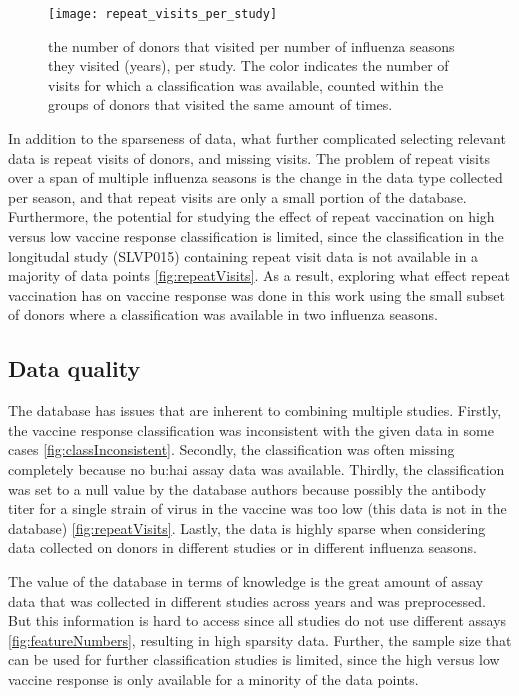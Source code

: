 \begin{figure}[htpb]
    \texttt{[image: repeat\_visits\_per\_study]}
    \caption{the number of donors that visited per number of influenza seasons
    they visited (years), per study. The color indicates the number of visits for which a
    classification was available, counted within the groups of donors that
    visited the same amount of times.}\label{fig:repeatVisits}
\end{figure}

In addition to the sparseness of data, what further complicated selecting relevant data is repeat visits of donors, and missing visits.
The problem of repeat visits over a span of multiple influenza seasons is the change in the data type collected per season, and that repeat visits are only a small portion of the database.
Furthermore, the potential for studying the effect of repeat vaccination on high versus low vaccine response classification is limited, since the classification in the longitudal study (SLVP015) containing repeat visit data is not available in a majority of data points \autoref{fig:repeatVisits}.
As a result, exploring what effect repeat vaccination has on vaccine response was done in this work using the small subset of donors where a classification was available in two influenza seasons.

\subsection{Data quality}

The database has issues that are inherent to combining multiple studies.
Firstly, the vaccine response classification was inconsistent with the given data in some cases \autoref{fig:classInconsistent}.
Secondly, the classification was often missing completely because no \gls{bu:hai} assay data was available.
Thirdly, the classification was set to a null value by the database authors because possibly the antibody titer for a single strain of virus in the vaccine was too low (this data is not in the database) \autoref{fig:repeatVisits}.
Lastly, the data is highly sparse when considering data collected on donors in different studies or in different influenza seasons.

The value of the database in terms of knowledge is the great amount of assay data that was collected in different studies across years and was preprocessed.
But this information is hard to access since all studies do not use different assays \autoref{fig:featureNumbers}, resulting in high sparsity data.
Further, the sample size that can be used for further classification studies is limited, since the high versus low vaccine response is only available for a minority of the data points.

